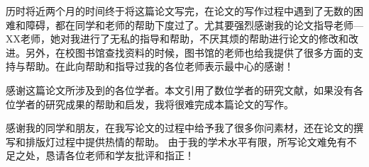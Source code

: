 
历时将近两个月的时间终于将这篇论文写完，在论文的写作过程中遇到了无数的困难和障碍，都在同学和老师的帮助下度过了。尤其要强烈感谢我的论文指导老师—XX老师，她对我进行了无私的指导和帮助，不厌其烦的帮助进行论文的修改和改进。另外，在校图书馆查找资料的时候，图书馆的老师也给我提供了很多方面的支持与帮助。在此向帮助和指导过我的各位老师表示最中心的感谢！

感谢这篇论文所涉及到的各位学者。本文引用了数位学者的研究文献，如果没有各位学者的研究成果的帮助和启发，我将很难完成本篇论文的写作。

感谢我的同学和朋友，在我写论文的过程中给予我了很多你问素材，还在论文的撰写和排版灯过程中提供热情的帮助。
由于我的学术水平有限，所写论文难免有不足之处，恳请各位老师和学友批评和指正！
